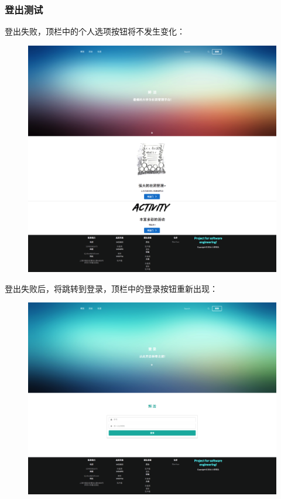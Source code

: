 \documentclass[UTF8]{ctexart}
\begin{document}
\subsubsection{登出测试}
登出失败，顶栏中的个人选项按钮将不发生变化：\\
\begin{figure}[H]
\centering
\includegraphics[width = .8\textwidth]{web-index.png}
\end{figure}
登出失败后，将跳转到登录，顶栏中的登录按钮重新出现：\\
\begin{figure}[H]
\centering
\includegraphics[width = .8\textwidth]{web-login.png}
\end{figure}
\end{document}
